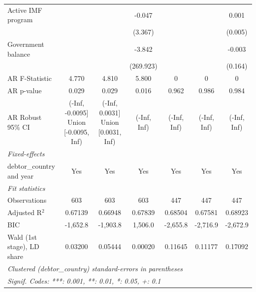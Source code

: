\begin{table}[htbp]
\begin{tabular}{lcccccc}
      Active IMF program         &                                      &                                    & -0.047      &             &             & 0.001\\   
                                 &                                      &                                    & (3.367)     &             &             & (0.005)\\   
      Government balance         &                                      &                                    & -3.842      &             &             & -0.003\\   
                                 &                                      &                                    & (269.923)   &             &             & (0.164)\\   
      AR F-Statistic             & 4.770                                & 4.810                              & 5.800       & 0           & 0           & 0\\  
      AR p-value                 & 0.029                                & 0.029                              & 0.016       & 0.962       & 0.986       & 0.984\\  
      AR Robust 95\% CI          & (-Inf, -0.0095] Union [-0.0095, Inf) & (-Inf, 0.0031] Union [0.0031, Inf) & (-Inf, Inf) & (-Inf, Inf) & (-Inf, Inf) & (-Inf, Inf)\\  
      \midrule
      \emph{Fixed-effects}\\
      debtor\_country and year   & Yes                                  & Yes                                & Yes         & Yes         & Yes         & Yes\\  
      \midrule
      \emph{Fit statistics}\\
      Observations               & 603                                  & 603                                & 603         & 447         & 447         & 447\\  
      Adjusted R$^2$             & 0.67139                              & 0.66948                            & 0.67839     & 0.68504     & 0.67581     & 0.68923\\  
      BIC                        & -1,652.8                             & -1,903.8                           & 1,506.0     & -2,655.8    & -2,716.9    & -2,672.9\\  
      Wald (1st stage), LD share & 0.03200                              & 0.05444                            & 0.00020     & 0.11645     & 0.11177     & 0.17092\\  
      \midrule \midrule
      \multicolumn{7}{l}{\emph{Clustered (debtor\_country) standard-errors in parentheses}}\\
      \multicolumn{7}{l}{\emph{Signif. Codes: ***: 0.001, **: 0.01, *: 0.05, +: 0.1}}\\
   \end{tabular}
\end{table}


